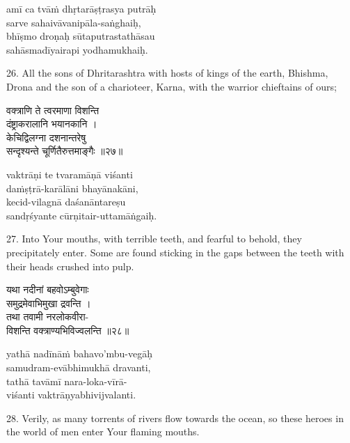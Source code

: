 \begin{transliteration}
amī ca tvāṁ dhṛtarāṣṭrasya putrāḥ \\
\tab sarve sahaivāvanipāla-saṅghaiḥ, \\
bhīṣmo droṇaḥ sūtaputrastathāsau \\
\tab sahāsmadīyairapi yodhamukhaiḥ.
\end{transliteration}

26. All the sons of Dhritarashtra with hosts of kings of the earth, Bhishma,
Drona and the son of a charioteer, Karna, with the warrior chieftains of ours;

\begin{gitaverse}
वक्त्राणि ते त्वरमाणा विशन्ति \\
\tab दंष्ट्राकरालानि भयानकानि । \\
केचिद्विलग्ना दशनान्तरेषु \\
\tab सन्दृश्यन्ते चूर्णितैरुत्तमाङ्गैः ॥२७॥
\end{gitaverse}

\begin{transliteration}
vaktrāṇi te tvaramāṇā viśanti \\
\tab daṁṣṭrā-karālāni bhayānakāni, \\
kecid-vilagnā daśanāntareṣu \\
\tab sandṛśyante cūrṇitair-uttamāṅgaiḥ.
\end{transliteration}

27. Into Your mouths, with terrible teeth, and fearful to behold, they
precipitately enter. Some are found sticking in the gaps between the teeth with
their heads crushed into pulp.

\begin{gitaverse}
यथा नदीनां बहवोऽम्बुवेगाः \\
\tab समुद्रमेवाभिमुखा द्रवन्ति । \\
तथा तवामी नरलोकवीरा- \\
\tab विशन्ति वक्त्राण्यभिविज्वलन्ति ॥२८॥
\end{gitaverse}

\begin{transliteration}
yathā nadīnāṁ bahavo'mbu-vegāḥ \\
\tab samudram-evābhimukhā dravanti, \\
tathā tavāmī nara-loka-vīrā- \\
\tab viśanti vaktrāṇyabhivijvalanti.
\end{transliteration}

28. Verily, as many torrents of rivers flow towards the ocean, so these heroes
in the world of men enter Your flaming mouths.

